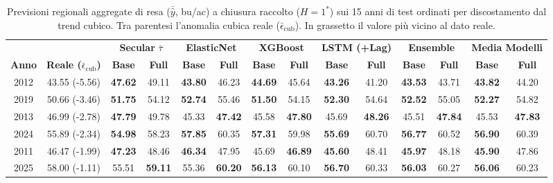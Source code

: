 \begin{table}[H]
\centering
\singlespacing
\scriptsize
\setlength{\tabcolsep}{1.8pt}
\renewcommand{\arraystretch}{1.06}
\caption{Previsioni regionali aggregate di resa ($\bar{\hat{y}}$, bu/ac) a chiusura raccolto ($H = 1^*$) sui 15 anni di test ordinati per discostamento dal trend cubico. Tra parentesi l'anomalia cubica reale ($\bar{\epsilon}_{\text{cub}}$). In grassetto il valore pi\`u vicino al dato reale.}
\label{tab:yearly_raw_yields}
\begin{tabular*}{\textwidth}{@{\extracolsep{\fill}} c c cc cc cc cc cc cc @{}}
\toprule
& & \multicolumn{2}{c}{\textbf{Secular } $\bar{\tau}$} & \multicolumn{2}{c}{\textbf{ElasticNet}} & \multicolumn{2}{c}{\textbf{XGBoost}} & \multicolumn{2}{c}{\textbf{LSTM (+Lag)}} & \multicolumn{2}{c}{\textbf{Ensemble}} & \multicolumn{2}{c}{\textbf{Media Modelli}} \\
\cmidrule(lr){3-4}\cmidrule(lr){5-6}\cmidrule(lr){7-8}\cmidrule(lr){9-10}\cmidrule(lr){11-12}\cmidrule(lr){13-14}
\textbf{Anno} & \textbf{Reale ($\bar{\epsilon}_{\text{cub}}$)} & \textbf{Base} & \textbf{Full} & \textbf{Base} & \textbf{Full} & \textbf{Base} & \textbf{Full} & \textbf{Base} & \textbf{Full} & \textbf{Base} & \textbf{Full} & \textbf{Base} & \textbf{Full} \\
\midrule
2012 & 43.55 {\tiny (-5.56)} & \textbf{47.62} & 49.11 & \textbf{43.80} & 46.23 & \textbf{44.69} & 45.64 & \textbf{43.26} & 41.20 & \textbf{43.53} & 43.71 & \textbf{43.82} & 44.20 \\
2019 & 50.66 {\tiny (-3.46)} & \textbf{51.75} & 54.12 & \textbf{52.74} & 55.46 & \textbf{51.50} & 54.15 & \textbf{52.30} & 54.64 & \textbf{52.52} & 55.05 & \textbf{52.27} & 54.82 \\
2013 & 46.99 {\tiny (-2.78)} & \textbf{47.79} & 49.78 & 45.33 & \textbf{47.42} & 45.58 & \textbf{47.80} & 45.69 & \textbf{48.26} & 45.51 & \textbf{47.84} & 45.53 & \textbf{47.83} \\
2024 & 55.89 {\tiny (-2.34)} & \textbf{54.98} & 58.23 & \textbf{57.85} & 60.35 & \textbf{57.31} & 59.98 & \textbf{55.69} & 60.70 & \textbf{56.77} & 60.52 & \textbf{56.90} & 60.39 \\
2011 & 46.47 {\tiny (-1.99)} & \textbf{47.23} & 48.46 & \textbf{46.34} & 47.95 & 45.69 & \textbf{46.89} & \textbf{45.60} & 48.41 & \textbf{45.97} & 48.18 & \textbf{45.90} & 47.86 \\
2025 & 58.00 {\tiny (-1.11)} & 55.51 & \textbf{59.11} & 55.36 & \textbf{60.20} & \textbf{56.13} & 60.10 & \textbf{56.70} & 60.33 & \textbf{56.03} & 60.27 & \textbf{56.06} & 60.23 \\

\end{tabular*}
\end{table}
